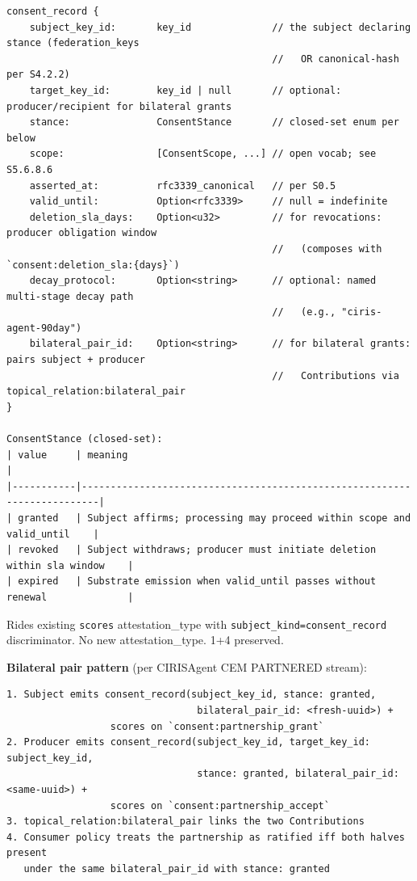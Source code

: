 \documentclass[11pt]{article}
\begin{document}
\begin{lstlisting}
consent_record {
    subject_key_id:       key_id              // the subject declaring stance (federation_keys
                                              //   OR canonical-hash per S4.2.2)
    target_key_id:        key_id | null       // optional: producer/recipient for bilateral grants
    stance:               ConsentStance       // closed-set enum per below
    scope:                [ConsentScope, ...] // open vocab; see S5.6.8.6
    asserted_at:          rfc3339_canonical   // per S0.5
    valid_until:          Option<rfc3339>     // null = indefinite
    deletion_sla_days:    Option<u32>         // for revocations: producer obligation window
                                              //   (composes with `consent:deletion_sla:{days}`)
    decay_protocol:       Option<string>      // optional: named multi-stage decay path
                                              //   (e.g., "ciris-agent-90day")
    bilateral_pair_id:    Option<string>      // for bilateral grants: pairs subject + producer
                                              //   Contributions via topical_relation:bilateral_pair
}

ConsentStance (closed-set):
| value     | meaning                                                                 |
|-----------|-------------------------------------------------------------------------|
| granted   | Subject affirms; processing may proceed within scope and valid_until    |
| revoked   | Subject withdraws; producer must initiate deletion within sla window    |
| expired   | Substrate emission when valid_until passes without renewal              |
\end{lstlisting}

Rides existing \texttt{scores} attestation\_type with \texttt{subject\_kind=consent\_record} discriminator. No new attestation\_type. 1+4 preserved.


\textbf{Bilateral pair pattern} (per CIRISAgent CEM PARTNERED stream):


\begin{lstlisting}
1. Subject emits consent_record(subject_key_id, stance: granted,
                                 bilateral_pair_id: <fresh-uuid>) +
                  scores on `consent:partnership_grant`
2. Producer emits consent_record(subject_key_id, target_key_id: subject_key_id,
                                 stance: granted, bilateral_pair_id: <same-uuid>) +
                  scores on `consent:partnership_accept`
3. topical_relation:bilateral_pair links the two Contributions
4. Consumer policy treats the partnership as ratified iff both halves present
   under the same bilateral_pair_id with stance: granted
\end{lstlisting}
\end{document}
